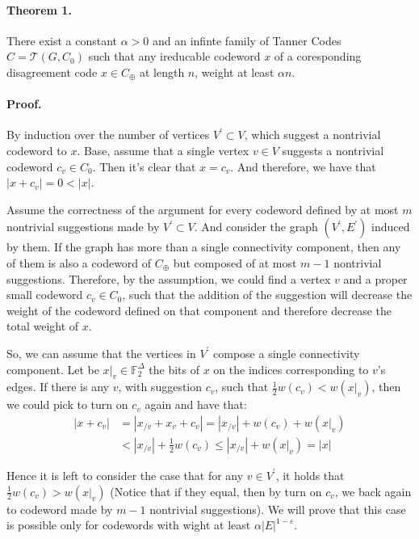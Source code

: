 \documentclass[sigplan,screen]{acmart}
\newcommand{ \Tann } {  \mathcal{T}\left( G, C_0 \right) }
\begin{document}
\begin{multicols*}{2}
  \paragraph{Theorem 1.} There exist a constant $\alpha > 0$ and an infinte family of Tanner Codes $C = \Tann$ such that any ireducable codeword $x$ of a coresponding disagreement code $x \in C_{\oplus}$ at length $n$, weight at least $\alpha n$.
  \paragraph{Proof.} By induction over the number of vertices $V^\prime \subset V$, which suggest a nontrivial codeword to $x$. Base, assume that a single vertex $v \in V$ suggests a nontrivial codeword $c_{v} \in C_{0}$. Then it's clear that $x = c_{v}$. And therefore, we have that $|x +c_{v}| = 0 < |x|$.

  Assume the correctness of the argument for every codeword defined by at most $m$ nontrivial suggestions made by $V^\prime \subset V$. And consider the graph $\left( V^\prime, E^\prime \right)$ induced by them. If the graph has more than a single connectivity component, then any of them is also a codeword of $C_{\oplus}$  but composed of at most $m-1$ nontrivial suggestions. Therefore, by the assumption, we could find a vertex $v$ and a proper small codeword $c_v \in C_0 $, such that the addition of the suggestion will decrease the weight of the codeword defined on that component and therefore decrease the total weight of $x$.

  So, we can assume that the vertices in $V^\prime$ compose a single connectivity component. Let be $x|_{v} \in \mathbb{F}_{2}^{\Delta}$ the bits of $x$ on the indices corresponding to $v$'s edges. If there is any $v$, with suggestion $c_{v}$, such that $ \frac{1}{2}w\left( c_{v}\right) < w\left( x|_{v} \right)$, then we could pick to turn on $c_{v}$ again and have that:
  \begin{equation*}
    \begin{split}
      |x+c_{v}| & = | x_{/v} + x_{v} + c_{v}| = |x_{/v}| + w\left( c_{v} \right) + w\left( x|_{v} \right) \\
      & < |x_{/v}| + \frac{1}{2}w\left( c_{v} \right) \le |x_{/v}| + w\left( x|_{v} \right) = |x|
    \end{split}
  \end{equation*}

  Hence it is left to consider the case that for any $v\in V^\prime$, it holds that $\frac{1}{2}w\left( c_{v}\right) >  w\left( x|_{v} \right)$ (Notice that if they equal, then by turn on $c_{v}$, we back again to codeword made by $m-1$ nontrivial suggestions). We will prove that this case is possible only for codewords with wight at least $\alpha|E|^{1-\varepsilon}$.


\end{multicols*}
\end{document}
